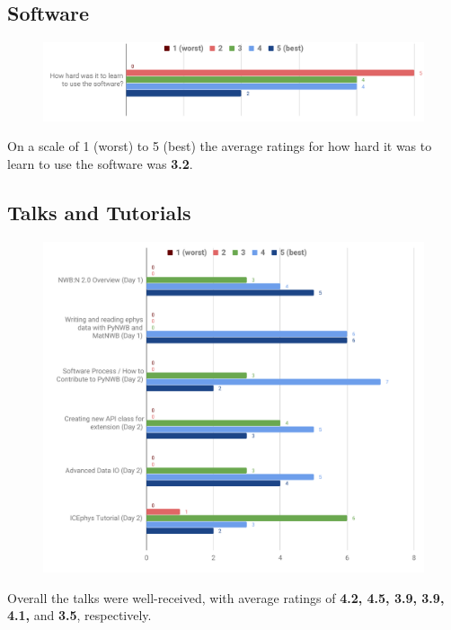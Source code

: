 \documentclass{article}
\begin{document}
\clearpage
\subsection{Software}
\begin{figure}[h!]
\centering
\includegraphics[width=\textwidth]{figures/user_developer_exit_survey_software.pdf}
\end{figure}

\noindent On a scale of 1 (worst) to 5 (best) the average ratings for how hard it was to learn to use the software was \textbf{3.2}. 

\subsection{Talks and Tutorials}

\begin{figure}[h!]
\centering
\includegraphics[width=\textwidth]{figures/user_developer_exit_survey_talks.pdf}
\end{figure}

\noindent Overall the talks were well-received, with average ratings of \textbf{4.2, 4.5, 3.9, 3.9, 4.1,} and \textbf{3.5}, respectively. 
\end{document}
